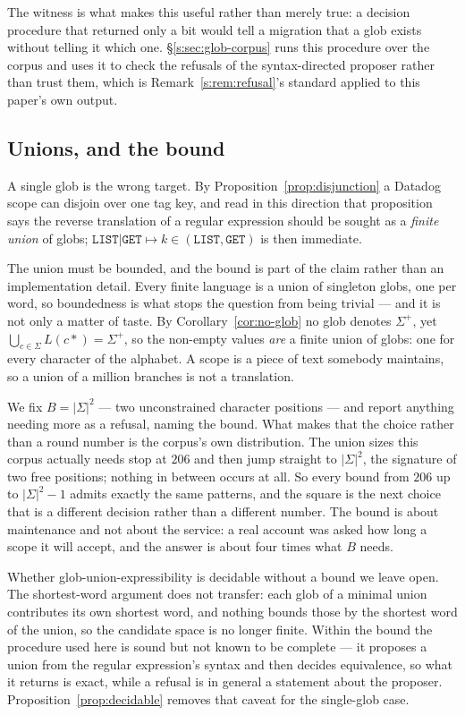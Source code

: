 \noindent
The witness is what makes this useful rather than merely true: a decision procedure that
returned only a bit would tell a migration that a glob exists without telling it which
one. \S\ref{s:sec:glob-corpus} runs this procedure over the corpus and uses it to check
the refusals of the syntax-directed proposer rather than trust them, which is
Remark~\ref{s:rem:refusal}'s standard applied to this paper's own output.

\subsection{Unions, and the bound}
\label{s:sec:glob-unions}

A single glob is the wrong target. By Proposition~\ref{prop:disjunction} a Datadog scope
can disjoin over one tag key, and read in this direction that proposition says the reverse
translation of a regular expression should be sought as a \emph{finite union} of globs;
$\mathtt{LIST|GET}\mapsto k \in (\texttt{LIST},\texttt{GET})$ is then immediate.

The union must be bounded, and the bound is part of the claim rather than an
implementation detail. Every finite language is a union of singleton globs, one per word,
so boundedness is what stops the question from being trivial --- and it is not only a
matter of taste. By Corollary~\ref{cor:no-glob} no glob denotes $\Sigma^{+}$, yet
$\bigcup_{c\in\Sigma}L(c*)=\Sigma^{+}$, so the non-empty values \emph{are} a finite union
of globs: one for every character of the alphabet. A scope is a piece of text somebody
maintains, so a union of a million branches is not a translation.

We fix $B=|\Sigma|^{2}$ --- two unconstrained character positions --- and report anything
needing more as a refusal, naming the bound. What makes that the choice rather than a
round number is the corpus's own distribution. The union sizes this corpus actually needs
stop at $206$ and then jump straight to $|\Sigma|^{2}$, the signature of two free
positions; nothing in between occurs at all. So every bound from $206$ up to
$|\Sigma|^{2}-1$ admits exactly the same patterns, and the square is the next choice that
is a different decision rather than a different number. The bound is about maintenance and
not about the service: a real account was asked how long a scope it will accept, and the
answer is about four times what $B$ needs.

Whether glob-union-expressibility is decidable without a bound we leave open. The
shortest-word argument does not transfer: each glob of a minimal union contributes its own
shortest word, and nothing bounds those by the shortest word of the union, so the
candidate space is no longer finite. Within the bound the procedure used here is sound but
not known to be complete --- it proposes a union from the regular expression's syntax and
then decides equivalence, so what it returns is exact, while a refusal is in general a
statement about the proposer. Proposition~\ref{prop:decidable} removes that caveat for the
single-glob case.

